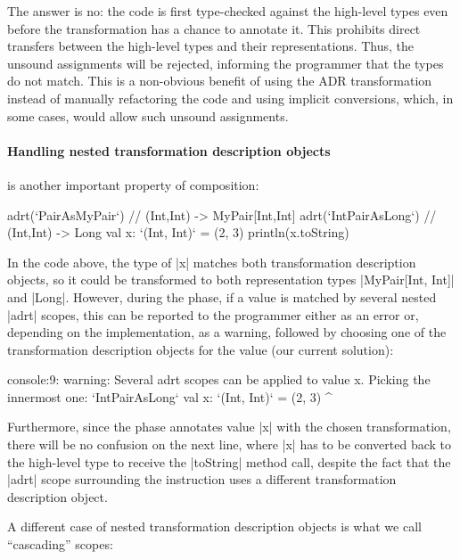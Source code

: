 The answer is no: the code is first type-checked against the high-level types even before the \inject{} transformation has a chance to annotate it. This prohibits direct transfers between the high-level types and their representations. Thus, the unsound assignments will be rejected, informing the programmer that the types do not match. This is a non-obvious benefit of using the ADR transformation instead of manually refactoring the code and using implicit conversions, which, in some cases, would allow such unsound assignments.



\paragraph*{Handling nested transformation description objects} is another important property of composition:

\begin{lstlisting-nobreak}
adrt(`PairAsMyPair`) {            // (Int,Int) -> MyPair[Int,Int]
  adrt(`IntPairAsLong`) { // (Int,Int) -> Long
    val x: `(Int, Int)` = (2, 3)
  }
  println(x.toString)
}
\end{lstlisting-nobreak}

In the code above, the type of |x| matches both transformation description objects, so it could be transformed to both representation types |MyPair[Int, Int]| and |Long|. However, during the \inject{} phase, if a value is matched by several nested |adrt| scopes, this can be reported to the programmer either as an error or, depending on the implementation, as a warning, followed by choosing one of the transformation description objects for the value (our current solution):

\begin{lstlisting-nobreak}
console:9:  warning: Several adrt scopes can be applied to value x. Picking the innermost one: `IntPairAsLong`
val x: `(Int, Int)` = (2, 3)
          ^
\end{lstlisting-nobreak}

Furthermore, since the \inject{} phase annotates value |x| with the chosen transformation, there will be no confusion on the next line, where |x| has to be converted back to the high-level type to receive the |toString| method call, despite the fact that the |adrt| scope surrounding the instruction uses a different transformation description object.

A different case of nested transformation description objects is what we call ``cascading'' scopes:

